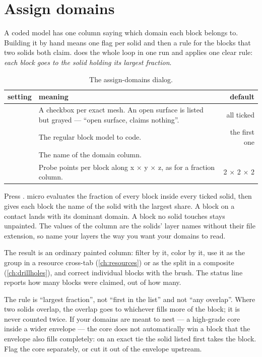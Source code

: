 \section{Assign domains}\label{sec:geometry-domains}

A coded model has one column saying which domain each block belongs to. Building it by hand means one flag per solid and then a rule for the blocks that two solids both claim.  does the whole loop in one run and applies one clear rule: \emph{each block goes to the solid holding its largest fraction}.

\begin{table}[htbp]\small
\begin{tabularx}{\linewidth}{@{}lMD@{}}\toprule
setting & meaning & default \\ \midrule
{} & A checkbox per exact mesh. An open surface is listed but grayed — “open surface, claims nothing”. & all ticked \\
 & The regular block model to code. & the first one \\
 & The name of the domain column. &  \\
 & Probe points per block along x × y × z, as for a fraction column. & 2 × 2 × 2 \\ \bottomrule
\end{tabularx}
\caption{The assign-domains dialog.}\label{tab:geometry-domains}
\end{table}

Press . micro evaluates the fraction of every block inside every ticked solid, then gives each block the name of the solid with the largest share. A block on a contact lands with its dominant domain. A block no solid touches stays unpainted. The values of the column are the solids' layer names without their file extension, so name your layers the way you want your domains to read.

The result is an ordinary painted column: filter by it, color by it, use it as the group in a resource cross-tab (\cref{ch:resources}) or as the split in a composite (\cref{ch:drillholes}), and correct individual blocks with the brush. The status line reports how many blocks were claimed, out of how many.

\begin{caution}
The rule is “largest fraction”, not “first in the list” and not “any overlap”. Where two solids overlap, the overlap goes to whichever fills more of the block; it is never counted twice. If your domains are meant to nest — a high-grade core inside a wider envelope — the core does not automatically win a block that the envelope also fills completely: on an exact tie the solid listed first takes the block. Flag the core separately, or cut it out of the envelope upstream.
\end{caution}

